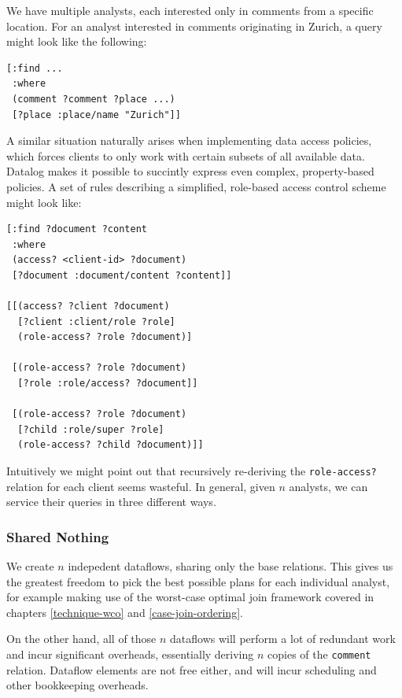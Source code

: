\documentclass[../catalog.tex]{subfiles}
\begin{document}
We have multiple analysts, each interested only in comments from a
specific location. For an analyst interested in comments originating
in Zurich, a query might look like the following:

\begin{verbatim}
[:find ...
 :where
 (comment ?comment ?place ...)
 [?place :place/name "Zurich"]]
\end{verbatim}

A similar situation naturally arises when implementing data access
policies, which forces clients to only work with certain subsets of
all available data. Datalog makes it possible to succintly express
even complex, property-based policies. A set of rules describing a
simplified, role-based access control scheme might look like:

\begin{verbatim}
[:find ?document ?content
 :where
 (access? <client-id> ?document)
 [?document :document/content ?content]]

[[(access? ?client ?document)
  [?client :client/role ?role]
  (role-access? ?role ?document)]

 [(role-access? ?role ?document)
  [?role :role/access? ?document]]
 
 [(role-access? ?role ?document)
  [?child :role/super ?role]
  (role-access? ?child ?document)]]
\end{verbatim}

Intuitively we might point out that recursively re-deriving the
\texttt{role-access?} relation for each client seems wasteful. In
general, given $n$ analysts, we can service their queries in three
different ways.

\subsubsection{Shared Nothing}

We create $n$ indepedent dataflows, sharing only the base
relations. This gives us the greatest freedom to pick the best
possible plans for each individual analyst, for example making use of
the worst-case optimal join framework covered in chapters
\ref{technique-wco} and \ref{case-join-ordering}.

On the other hand, all of those $n$ dataflows will perform a lot of
redundant work and incur significant overheads, essentially deriving
$n$ copies of the \texttt{comment} relation. Dataflow elements are not
free either, and will incur scheduling and other bookkeeping
overheads.
\end{document}
